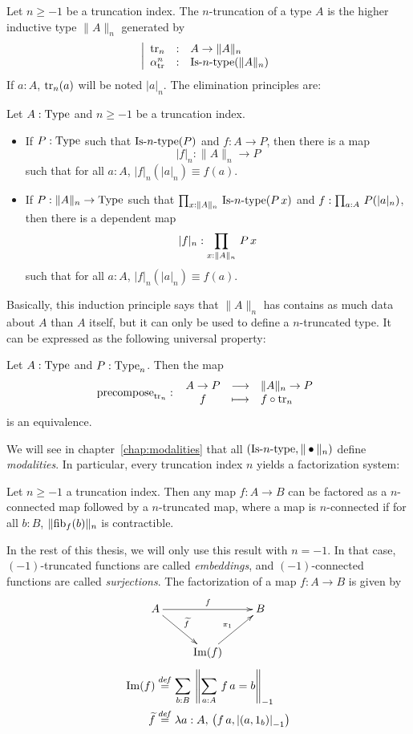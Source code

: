 Let $n\geqslant -1$ be a truncation index. The $n$-truncation of a
type $A$ is the
higher inductive type $\|A\|_n$ 
 generated by
\[
  \left|
    \begin{array}{lll}
      \operatorname{tr}_n &:& A \to \|A\|_n \\
      \alpha_{\operatorname{tr}}^n &:& \mathop{\mathrm{Is{\hbox{-}}}n\mathrm{{\hbox{-}} type}} (\|A\|_n)
    \end{array}
  \right.
\]
If $a:A$, $\operatorname{tr}_n(a)$ will be noted $|a|_n$.
The elimination principles are:
\begin{lem}\label{lem:trunc_elim}
  Let $A:\operatorname{Type}$ and $n\geqslant -1$ be a truncation index.
  \begin{itemize}
  \item If $P:\operatorname{Type}$ such that $\mathop{\mathrm{Is{\hbox{-}}}n\mathrm{{\hbox{-}} type}}(P)$ and $f:A \to P$, then
    there is a map
    \[|f|_n : \|A\|_n \to P\]
    such that for all $a:A$, $|f|_n(|a|_n) \equiv f(a)$.
  \item If $P:\|A\|_n \to \operatorname{Type}$ such that $\prod_{x:\|A\|_n}\, \mathop{\mathrm{Is{\hbox{-}}}n\mathrm{{\hbox{-}} type}} (P\, x)$ and $f:\prod_{a:A}\, P(|a|_n)$, then there is
    a dependent map
    \[|f|_n : \prod_{x:\|A\|_n}\, P\, x\]
    such that for all $a:A$, $|f|_n(|a|_n) \equiv f(a)$.
  \end{itemize}
\end{lem}
Basically, this induction principle says that $\|A\|_n$ has contains
as much data about $A$ than $A$ itself, but it can only be used to
define a $n$-truncated type. It can be expressed as the following
universal property:
\begin{lem}
  Let $A:\operatorname{Type}$ and $P:\operatorname{Type}_n$. Then the map
\[
  \operatorname{\mathrm{precompose}}_{\operatorname{tr}_n} \, \colon \left. \begin{array}{ccl} A\to P & \longrightarrow & \|A\|_n \to P \\ f & \longmapsto & f \circ \operatorname{tr}_n \end{array} \right.
\]
is an equivalence.
\end{lem}
We will see in chapter~\ref{chap:modalities} that all $(\mathop{\mathrm{Is{\hbox{-}}}n\mathrm{{\hbox{-}} type}},\|\bullet\|_n)$ define {\em modalities}. In particular, every
truncation index $n$ yields a factorization system:

\begin{prop}
  Let $n\geqslant -1$ a truncation index. Then any map $f:A\to B$ can
  be factored as a $n$-connected map followed by a $n$-truncated map,
  where a map is $n$-connected if for all $b:B$, $\|\mathrm{fib}_{f}(b)\|_n$ is contractible.
\end{prop}

In the rest of this thesis, we will only use this result with
$n=-1$. In that case, $(-1)$-truncated functions are called {\em
  embeddings}, and $(-1)$-connected functions are called {\em
  surjections}. The factorization of a map $f:A\to B$ is given by
\[
  \xymatrix{
    A \ar[rr]^f \ar[rd]^{\widetilde f} && B \\
    & \im(f)  \ar[ru]^{\pi_1} &
  }
\]
\begin{align*}
  \operatorname{Im}(f) &\overset{de\hspace{-0.2ex}f}{=} \sum_{b:B}\, \left\| \sum_{a:A}\, f\, a = b
  \right\|_{-1} \\
  \widetilde f &\overset{de\hspace{-0.2ex}f}{=} \lambda a:A,\, \left(f\, a,\left|(a,1_b)\right|_{-1}\right)
\end{align*}
